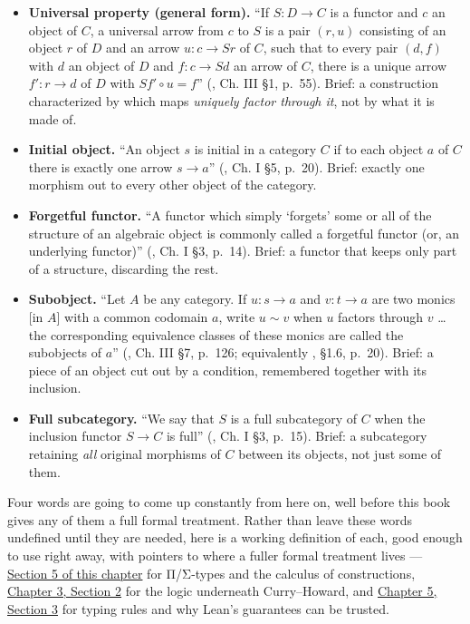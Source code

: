 \begin{itemize}
\item
  \textbf{Universal property (general form).} ``If \(S : D \to C\) is a functor and \(c\) an object of \(C\), a universal arrow from \(c\) to \(S\) is a pair \((r, u)\) consisting of an object \(r\) of \(D\) and an arrow \(u : c \to Sr\) of \(C\), such that to every pair \((d, f)\) with \(d\) an object of \(D\) and \(f : c \to Sd\) an arrow of \(C\), there is a unique arrow \(f' : r \to d\) of \(D\) with \(Sf' \circ u = f\)'' (\cite{MacLane1998}, Ch. III §1, p.~55). Brief: a construction characterized by which maps \emph{uniquely factor through it}, not by what it is made of.
\item
  \textbf{Initial object.} ``An object \(s\) is initial in a category \(C\) if to each object \(a\) of \(C\) there is exactly one arrow \(s \to a\)'' (\cite{MacLane1998}, Ch. I §5, p.~20). Brief: exactly one morphism out to every other object of the category.
\item
  \textbf{Forgetful functor.} ``A functor which simply `forgets' some or all of the structure of an algebraic object is commonly called a forgetful functor (or, an underlying functor)'' (\cite{MacLane1998}, Ch. I §3, p.~14). Brief: a functor that keeps only part of a structure, discarding the rest.
\item
  \textbf{Subobject.} ``Let \(A\) be any category. If \(u : s \to a\) and \(v : t \to a\) are two monics {[}in \(A\){]} with a common codomain \(a\), write \(u \sim v\) when \(u\) factors through \(v\) \ldots{} the corresponding equivalence classes of these monics are called the subobjects of \(a\)'' (\cite{MacLane1998}, Ch. III §7, p.~126; equivalently \cite{Pareigis1970}, §1.6, p.~20). Brief: a piece of an object cut out by a condition, remembered together with its inclusion.
\item
  \textbf{Full subcategory.} ``We say that \(S\) is a full subcategory of \(C\) when the inclusion functor \(S \to C\) is full'' (\cite{MacLane1998}, Ch. I §3, p.~15). Brief: a subcategory retaining \emph{all} original morphisms of \(C\) between its objects, not just some of them.
\end{itemize}

Four words are going to come up constantly from here on, well before this book gives any of them a full formal treatment. Rather than leave these words undefined until they are needed, here is a working definition of each, good enough to use right away, with pointers to where a fuller formal treatment lives --- \hyperref[sec:01-basics:05-pi-sigma-and-coc:1]{Section 5 of this chapter} for Π/Σ-types and the calculus of constructions, \hyperref[sec:03-propositions-and-proofs:02-logic-recap:1]{Chapter 3, Section 2} for the logic underneath Curry--Howard, and \hyperref[sec:05-rigor-check:03-typing-rules-and-safety:1]{Chapter 5, Section 3} for typing rules and why Lean's guarantees can be trusted.

